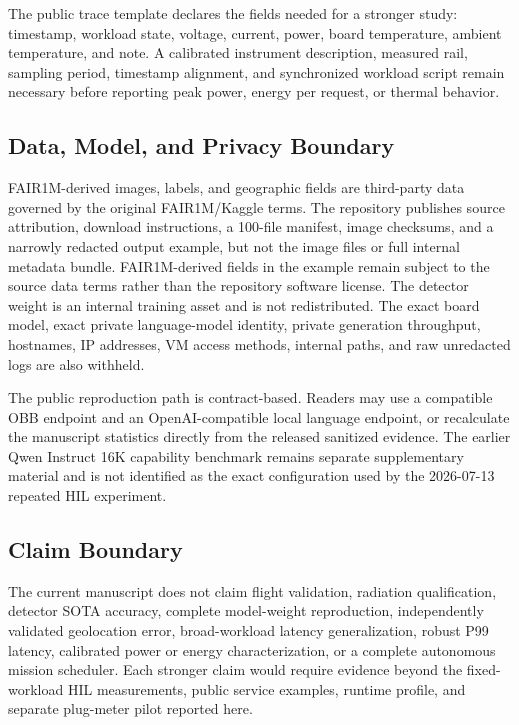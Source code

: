The public trace template declares the fields needed for a stronger study: timestamp, workload state, voltage, current, power, board temperature, ambient temperature, and note. A calibrated instrument description, measured rail, sampling period, timestamp alignment, and synchronized workload script remain necessary before reporting peak power, energy per request, or thermal behavior.

\subsection{Data, Model, and Privacy Boundary}

FAIR1M-derived images, labels, and geographic fields are third-party data governed by the original FAIR1M/Kaggle terms. The repository publishes source attribution, download instructions, a 100-file manifest, image checksums, and a narrowly redacted output example, but not the image files or full internal metadata bundle. FAIR1M-derived fields in the example remain subject to the source data terms rather than the repository software license. The detector weight is an internal training asset and is not redistributed. The exact board model, exact private language-model identity, private generation throughput, hostnames, IP addresses, VM access methods, internal paths, and raw unredacted logs are also withheld.

The public reproduction path is contract-based. Readers may use a compatible OBB endpoint and an OpenAI-compatible local language endpoint, or recalculate the manuscript statistics directly from the released sanitized evidence. The earlier Qwen Instruct 16K capability benchmark remains separate supplementary material and is not identified as the exact configuration used by the 2026-07-13 repeated HIL experiment.

\subsection{Claim Boundary}

The current manuscript does not claim flight validation, radiation qualification, detector SOTA accuracy, complete model-weight reproduction, independently validated geolocation error, broad-workload latency generalization, robust P99 latency, calibrated power or energy characterization, or a complete autonomous mission scheduler. Each stronger claim would require evidence beyond the fixed-workload HIL measurements, public service examples, runtime profile, and separate plug-meter pilot reported here.

\clearpage
